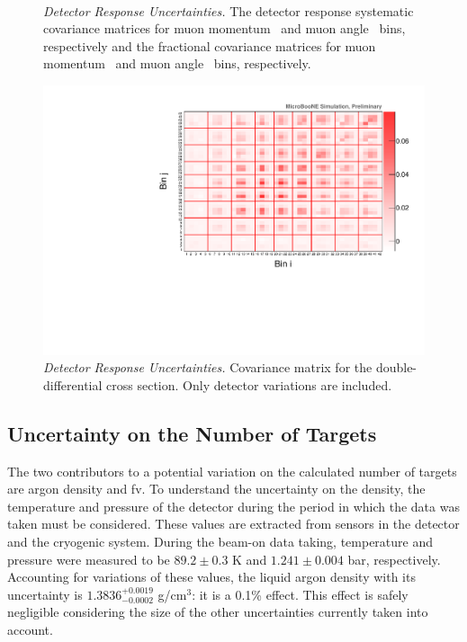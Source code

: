 \begin{figure}[t]
{   \label{fig:cov_det_frac_muangle}} \\
\caption[Detector Response Uncertainties - Single-Differential Cross Sections - Covariance Matrices]{\emph{Detector Response Uncertainties.} The detector response systematic covariance matrices for muon momentum~\protect{} and muon angle~\protect{} bins, respectively and the fractional covariance matrices for muon momentum~\protect{} and muon angle~\protect{} bins, respectively.}
\label{fig:cov_det}
\end{figure}



\begin{figure}[]
\centering
\includegraphics[width=.80\textwidth]{images/detector_covariance_plots/cov_det_muangle_mumom}
\caption[Detector Response Uncertainties - Double-Differential Cross Section - Covariance Matrix]{\emph{Detector Response Uncertainties.} Covariance matrix for the double-differential cross section. Only detector variations are included.}
\label{fig:cov_det_muangle_mumom}
\end{figure}







\subsection{Uncertainty on the Number of Targets}
\label{sec:error_targets}

The two contributors to a potential variation on the calculated number of targets are argon density and \acrshort{fv}. To understand the uncertainty on the density, the temperature and pressure of the detector during the period in which the data was taken must be considered. These values are extracted from sensors in the detector and the cryogenic system. During the beam-on data taking, temperature and pressure were measured to be $89.2 \pm 0.3$ K and $1.241 \pm 0.004$ bar, respectively. Accounting for variations of these values, the liquid argon density with its uncertainty is $1.3836^{+0.0019}_{-0.0002}$ g/cm$^3$: it is a 0.1\% effect. This effect is safely negligible considering the size of the other uncertainties currently taken into account.



